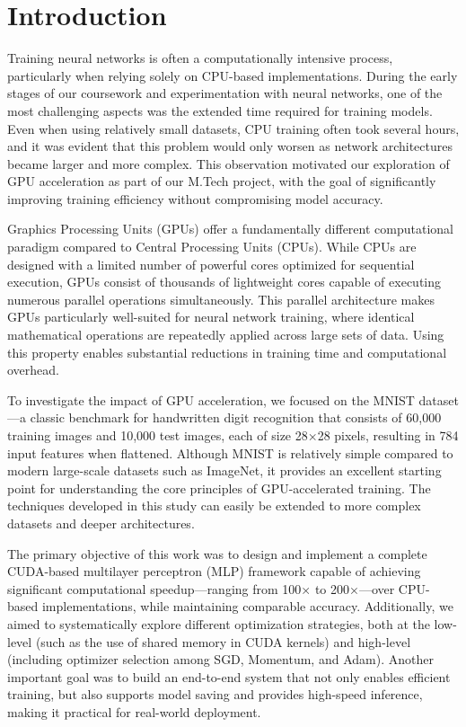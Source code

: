 \documentclass[conference]{IEEEtran}
\begin{document}
\section{Introduction}

Training neural networks is often a computationally intensive process, particularly when relying solely on CPU-based implementations. During the early stages of our coursework and experimentation with neural networks, one of the most challenging aspects was the extended time required for training models. Even when using relatively small datasets, CPU training often took several hours, and it was evident that this problem would only worsen as network architectures became larger and more complex. This observation motivated our exploration of GPU acceleration as part of our M.Tech project, with the goal of significantly improving training efficiency without compromising model accuracy.

Graphics Processing Units (GPUs) offer a fundamentally different computational paradigm compared to Central Processing Units (CPUs). While CPUs are designed with a limited number of powerful cores optimized for sequential execution, GPUs consist of thousands of lightweight cores capable of executing numerous parallel operations simultaneously. This parallel architecture makes GPUs particularly well-suited for neural network training, where identical mathematical operations are repeatedly applied across large sets of data. Using this property enables substantial reductions in training time and computational overhead.

To investigate the impact of GPU acceleration, we focused on the MNIST dataset—a classic benchmark for handwritten digit recognition that consists of 60,000 training images and 10,000 test images, each of size 28×28 pixels, resulting in 784 input features when flattened. Although MNIST is relatively simple compared to modern large-scale datasets such as ImageNet, it provides an excellent starting point for understanding the core principles of GPU-accelerated training. The techniques developed in this study can easily be extended to more complex datasets and deeper architectures.

The primary objective of this work was to design and implement a complete CUDA-based multilayer perceptron (MLP) framework capable of achieving significant computational speedup—ranging from 100× to 200×—over CPU-based implementations, while maintaining comparable accuracy. Additionally, we aimed to systematically explore different optimization strategies, both at the low-level (such as the use of shared memory in CUDA kernels) and high-level (including optimizer selection among SGD, Momentum, and Adam). Another important goal was to build an end-to-end system that not only enables efficient training, but also supports model saving and provides high-speed inference, making it practical for real-world deployment.
\end{document}

